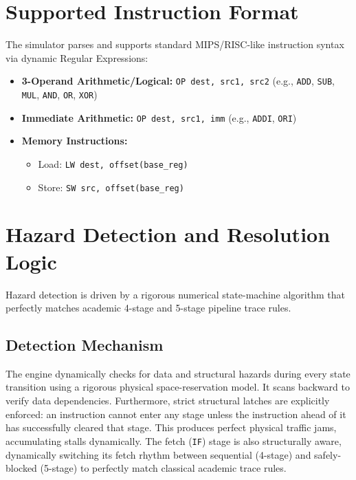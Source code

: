 \documentclass[12pt,a4paper]{article}
\begin{document}
\section{Supported Instruction Format}
The simulator parses and supports standard MIPS/RISC-like instruction syntax via dynamic Regular Expressions:
\begin{itemize}
    \item \textbf{3-Operand Arithmetic/Logical:} \texttt{OP dest, src1, src2} (e.g., \texttt{ADD}, \texttt{SUB}, \texttt{MUL}, \texttt{AND}, \texttt{OR}, \texttt{XOR})
    \item \textbf{Immediate Arithmetic:} \texttt{OP dest, src1, imm} (e.g., \texttt{ADDI}, \texttt{ORI})
    \item \textbf{Memory Instructions:} 
    \begin{itemize}
        \item Load: \texttt{LW dest, offset(base\_reg)}
        \item Store: \texttt{SW src, offset(base\_reg)}
    \end{itemize}
\end{itemize}

\section{Hazard Detection and Resolution Logic}
Hazard detection is driven by a rigorous numerical state-machine algorithm that perfectly matches academic 4-stage and 5-stage pipeline trace rules.

\subsection{Detection Mechanism}
The engine dynamically checks for data and structural hazards during every state transition using a rigorous physical space-reservation model. It scans backward to verify data dependencies. Furthermore, strict structural latches are explicitly enforced: an instruction cannot enter any stage unless the instruction ahead of it has successfully cleared that stage. This produces perfect physical traffic jams, accumulating stalls dynamically. The fetch (\texttt{IF}) stage is also structurally aware, dynamically switching its fetch rhythm between sequential (4-stage) and safely-blocked (5-stage) to perfectly match classical academic trace rules.
\end{document}
